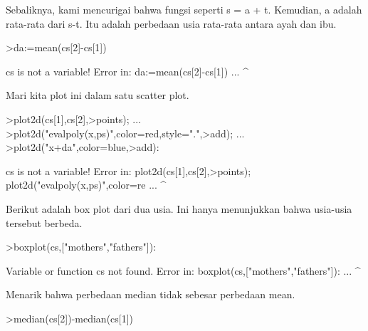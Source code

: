 \documentclass[12pt,arial,letterpaper]{book}
\begin{document}
\begin{eulercomment}
\begin{eulercomment}
\begin{eulercomment}
\begin{eulercomment}
\begin{eulercomment}
\begin{eulercomment}
\begin{eulercomment}
\begin{eulercomment}
\begin{eulercomment}
\begin{eulercomment}
\begin{eulercomment}
\begin{eulercomment}
\begin{eulercomment}
\begin{eulercomment}
\begin{eulercomment}
\begin{eulercomment}
\begin{eulercomment}
\begin{eulercomment}
\begin{eulercomment}
\begin{eulercomment}
\begin{eulercomment}
\begin{eulercomment}
\begin{eulercomment}
\begin{eulercomment}
\begin{eulercomment}
\begin{eulercomment}
\begin{eulercomment}
\begin{eulercomment}
\begin{eulercomment}
\begin{eulercomment}
\begin{eulercomment}
\begin{eulercomment}
\begin{eulercomment}
Sebaliknya, kami mencurigai bahwa fungsi seperti s = a + t. Kemudian,
a adalah rata-rata dari s-t. Itu adalah perbedaan usia rata-rata
antara ayah dan ibu.
\end{eulercomment}
\begin{eulerprompt}
>da:=mean(cs[2]-cs[1])
\end{eulerprompt}
\begin{euleroutput}
  cs is not a variable!
  Error in:
  da:=mean(cs[2]-cs[1]) ...
                ^
\end{euleroutput}
\begin{eulercomment}
Mari kita plot ini dalam satu scatter plot.
\end{eulercomment}
\begin{eulerprompt}
>plot2d(cs[1],cs[2],>points);  ...
>plot2d("evalpoly(x,ps)",color=red,style=".",>add);  ...
>plot2d("x+da",color=blue,>add):
\end{eulerprompt}
\begin{euleroutput}
  cs is not a variable!
  Error in:
  plot2d(cs[1],cs[2],>points);  plot2d("evalpoly(x,ps)",color=re ...
              ^
\end{euleroutput}
\begin{eulercomment}
Berikut adalah box plot dari dua usia. Ini hanya menunjukkan bahwa
usia-usia tersebut berbeda.
\end{eulercomment}
\begin{eulerprompt}
>boxplot(cs,["mothers","fathers"]):
\end{eulerprompt}
\begin{euleroutput}
  Variable or function cs not found.
  Error in:
  boxplot(cs,["mothers","fathers"]): ...
            ^
\end{euleroutput}
\begin{eulercomment}
Menarik bahwa perbedaan median tidak sebesar perbedaan mean.
\end{eulercomment}
\begin{eulerprompt}
>median(cs[2])-median(cs[1])

\end{eulerprompt}
\end{eulercomment}
\end{eulercomment}
\end{eulercomment}
\end{eulercomment}
\end{eulercomment}
\end{eulercomment}
\end{eulercomment}
\end{eulercomment}
\end{eulercomment}
\end{eulercomment}
\end{eulercomment}
\end{eulercomment}
\end{eulercomment}
\end{eulercomment}
\end{eulercomment}
\end{eulercomment}
\end{eulercomment}
\end{eulercomment}
\end{eulercomment}
\end{eulercomment}
\end{eulercomment}
\end{eulercomment}
\end{eulercomment}
\end{eulercomment}
\end{eulercomment}
\end{eulercomment}
\end{eulercomment}
\end{eulercomment}
\end{eulercomment}
\end{eulercomment}
\end{eulercomment}
\end{eulercomment}
\end{document}
